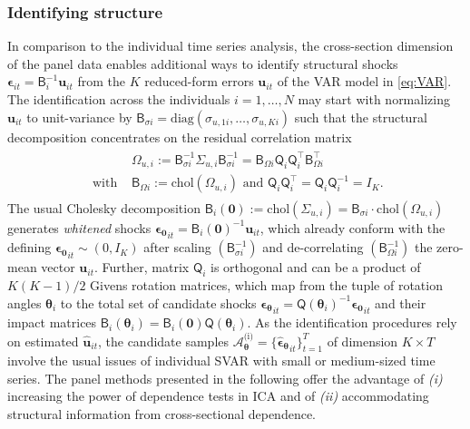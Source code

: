 \subsubsection{Identifying structure}
In comparison to the individual time series analysis, the cross-section dimension of the panel data enables additional ways to identify structural shocks $ \boldsymbol{\epsilon}_{it} = \mathsf{B}_i^{-1} \boldsymbol{u}_{it} $ from the $ K $ reduced-form errors $ \boldsymbol{u}_{it} $ of the VAR model in \eqref{eq:VAR}. The identification across the individuals $ i=1,\ldots,N $ may start with normalizing $ \boldsymbol{u}_{it} $ to unit-variance by $ \textsf{B}_{\sigma i} = \text{diag}\left( \sigma_{u,1i}, \ldots, \sigma_{u,Ki} \right) $ such that the structural decomposition concentrates on the residual correlation matrix
\begin{align}
\begin{split}
	&\Omega_{u,i} := \textsf{B}_{\sigma i}^{-1} \Sigma^{\ }_{u,i} \textsf{B}_{\sigma i}^{-1} = \textsf{B}_{\Omega i}^{\ } \mathsf{Q}_i^{\ } \mathsf{Q}_i^\top \textsf{B}_{\Omega i}^\top \\
	\text{ with } & \textsf{B}_{\Omega i} := \text{chol}\left( \Omega_{u,i} \right) \text{ and } \mathsf{Q}_i^{\ } \mathsf{Q}_i^\top = \mathsf{Q}_i^{\ } \mathsf{Q}_i^{-1} = I_K.
\end{split}
\end{align}
The usual Cholesky decomposition $ \textsf{B}_{i} \left( \boldsymbol{0} \right) := \text{chol}\left( \Sigma_{u,i} \right) = \textsf{B}_{\sigma i} \cdot \text{chol}\left( \Omega_{u,i} \right) $ generates \textit{whitened} shocks $ \boldsymbol{\epsilon_0}_{it} = \mathsf{B}_i \left( \boldsymbol{0} \right)^{-1} \boldsymbol{u}_{it} $, which already conform with the defining $ \boldsymbol{\epsilon_0}_{it} \sim ( 0, I_K ) $ after scaling $ \left( \textsf{B}_{\sigma i}^{-1} \right) $ and de-correlating $ \left( \textsf{B}_{\Omega i}^{-1} \right) $ the zero-mean vector $ \boldsymbol{u}_{it} $. Further, matrix $ \mathsf{Q}_i $ is orthogonal and can be a product of $ K(K-1)/2 $ Givens rotation matrices, which map from the tuple of rotation angles $ \boldsymbol{\theta}_i $ to the total set of candidate shocks $ \boldsymbol{\epsilon_\theta}_{it} = \mathsf{Q} \left( \boldsymbol{\theta}_i \right)^{-1} \boldsymbol{\epsilon_0}_{it} $ and their impact matrices $ \mathsf{B}_i \left( \boldsymbol{\theta}_i \right) = \textsf{B}_{i} \left( \boldsymbol{0} \right) \mathsf{Q} \left( \boldsymbol{\theta}_i \right) $. As the identification procedures rely on estimated $ \boldsymbol{\widehat{u}}_{it} $, the candidate samples $ \mathcal{A}_{\boldsymbol{\theta}}^{\text{(i)}} = \{ \boldsymbol{\widehat{\epsilon}_\theta}_{it} \}^T_{t=1} $ of dimension $ K \times T $ involve the usual issues of individual SVAR with small or medium-sized time series. The panel methods presented in the following offer the advantage of \textit{(i)} increasing the power of dependence tests in ICA and of \textit{(ii)} accommodating structural information from cross-sectional dependence.
